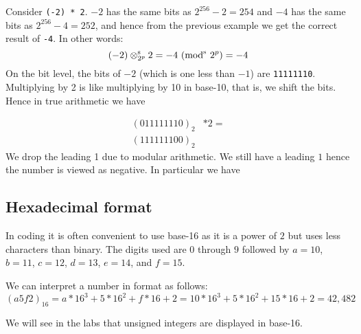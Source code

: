 \begin{example} Consider \texttt{(-2) * 2}. $-2$ has the same bits as $2^{256} - 2 = 254$ and $-4$ has the same bits as $2^{256}-4 = 252$, and hence from the previous example we get the correct result of \texttt{-4}. In other words:
\[
(-2) \ensuremath{\otimes}_{2^p}^{\rm s} 2 = -4 \ ({\rm mod}^{\rm s}\ 2^p) = -4
\]
On the bit level, the bits of $-2$ (which is one less than $-1$) are \texttt{11111110}. Multiplying by 2 is like multiplying by 10 in base-10, that is, we shift the bits. Hence in true arithmetic we have


\begin{align*}
(0 11111110)_2 & * 2 = \\
(1 11111100)_2&
\end{align*}
We drop the leading 1 due to modular arithmetic. We still have a leading $1$ hence the number is viewed as negative. In particular we have
\end{example}

\subsection{Hexadecimal format}
In coding it is often convenient to use base-16 as it is a power of $2$ but uses less characters than binary. The digits used are $0$ through $9$ followed by $a = 10$, $b = 11$, $c = 12$, $d = 13$, $e = 14$, and $f = 15$. 

\begin{example} We can interpret a number in format as follows:
\[
(a5f2)_{16} = a*16^3 + 5*16^2 + f*16 + 2 = 
10*16^3 + 5*16^2 + 15*16 + 2 = 42,482
\]
\end{example}

We will see in the labs that unsigned integers are displayed in base-16.



